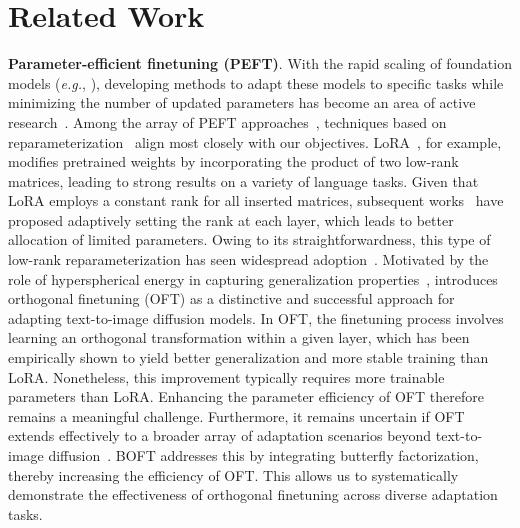 \section{Related Work}

\textbf{Parameter-efficient finetuning (PEFT)}. With the rapid scaling of foundation models (\emph{e.g.}, \cite{brown2020language,radford2021learning,rombach2022high,kirillov2023segment}), developing methods to adapt these models to specific tasks while minimizing the number of updated parameters has become an area of active research~\cite{treviso2023efficient,ding2023parameter,lialin2023scaling}. Among the array of PEFT approaches~\cite{houlsby2019parameter,aghajanyan2020intrinsic,hulora2022,edalati2022krona,wang2022adamix,gheini2021cross,zaken2022bitfit,guo2020parameter,sung2021training,ansell2022composable,lester2021power,li2021prefix,vu2022spot,he2021towards,mao2021unipelt,karimi2021compacter,liu2022few,sung2022lst,chen2022parameter,jia2022visual,chen2022adaptformer,zhang2022neural,jie2023fact,lian2022scaling,luo2023towards}, techniques based on reparameterization~\cite{aghajanyan2020intrinsic,hulora2022,edalati2022krona} align most closely with our objectives. LoRA~\cite{hulora2022}, for example, modifies pretrained weights by incorporating the product of two low-rank matrices, leading to strong results on a variety of language tasks. Given that LoRA employs a constant rank for all inserted matrices, subsequent works~\cite{zhang2022adaptive,valipour2022dylora,zhang2023increlora} have proposed adaptively setting the rank at each layer, which leads to better allocation of limited parameters. Owing to its straightforwardness, this type of low-rank reparameterization has seen widespread adoption~\cite{dettmers2023qlora,zi2023delta,chavan2023one}. Motivated by the role of hyperspherical energy in capturing generalization properties~\cite{liu2018learning,liu2021orthogonal}, \cite{qiu2023controlling} introduces orthogonal finetuning (OFT) as a distinctive and successful approach for adapting text-to-image diffusion models. In OFT, the finetuning process involves learning an orthogonal transformation within a given layer, which has been empirically shown to yield better generalization and more stable training than LoRA. Nonetheless, this improvement typically requires more trainable parameters than LoRA. Enhancing the parameter efficiency of OFT therefore remains a meaningful challenge. Furthermore, it remains uncertain if OFT extends effectively to a broader array of adaptation scenarios beyond text-to-image diffusion~\cite{qiu2023controlling}. BOFT addresses this by integrating butterfly factorization, thereby increasing the efficiency of OFT. This allows us to systematically demonstrate the effectiveness of orthogonal finetuning across diverse adaptation tasks.

